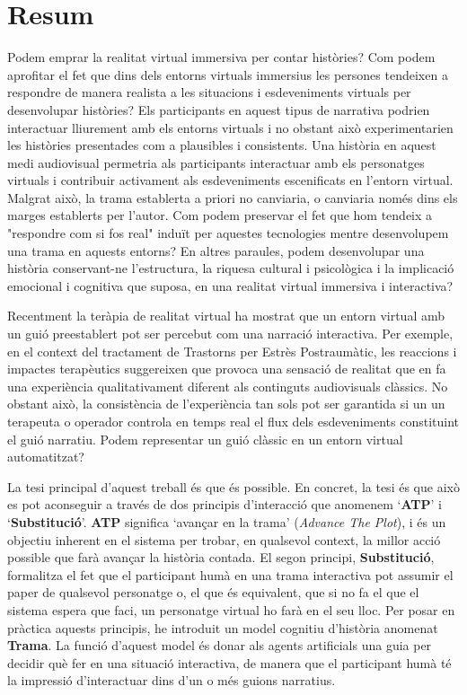 \documentclass[
		twoside,openright,titlepage,numbers=noenddot,manychapters,
		headinclude,%
                footinclude=false,cleardoublepage=empty,
                BCOR=5mm,
		fontsize=11pt, %
                 enabledeprecatedfontcommands]{scrreprt}
\begin{document}
\chapter*{Resum}
\thispagestyle{empty}
Podem emprar la realitat virtual immersiva per contar històries? Com podem aprofitar el fet que dins dels entorns virtuals immersius les persones tendeixen a respondre de manera realista a les situacions i esdeveniments virtuals per desenvolupar històries? Els participants en aquest tipus de narrativa podrien interactuar lliurement  amb els entorns virtuals i no obstant això experimentarien les històries presentades com a plausibles i consistents. Una història en aquest medi audiovisual permetria als participants interactuar amb els personatges virtuals i contribuir activament als esdeveniments escenificats en l'entorn virtual. Malgrat això, la trama establerta a priori no canviaria, o canviaria només dins els marges establerts per l'autor. Com podem preservar el fet que hom tendeix a "respondre com si fos real" induït per aquestes tecnologies mentre desenvolupem una trama en aquests entorns? En altres paraules, podem desenvolupar una història conservant-ne l'estructura, la riquesa cultural i psicològica i la implicació emocional i cognitiva que suposa, en una realitat virtual immersiva i interactiva?

Recentment la teràpia de realitat virtual ha mostrat que un entorn virtual  amb un guió preestablert pot ser percebut com una narració interactiva. Per exemple, en el context del tractament de Trastorns per Estrès Postraumàtic, les reaccions i impactes terapèutics suggereixen que provoca una sensació de realitat que en fa una experiència qualitativament diferent als continguts audiovisuals clàssics. No obstant això, la consistència de l'experiència tan sols pot ser garantida si un un terapeuta o operador controla en temps real el flux dels esdeveniments constituint el guió narratiu. Podem representar un guió clàssic en un entorn virtual automatitzat?

La tesi principal d'aquest treball és que és possible. En concret, la tesi és que això es pot aconseguir a través de dos principis d'interacció que anomenem `\textbf {ATP}' i `\textbf {Substitució}'. \textbf {ATP} significa `avançar en la trama' (\emph{Advance The Plot}), i és un objectiu inherent  en el sistema per trobar, en qualsevol context, la millor acció possible que farà avançar la història contada. El segon principi, \textbf {Substitució}, formalitza el fet que el participant humà en una trama interactiva pot assumir el paper de qualsevol personatge o, el que és equivalent, que si no fa el que el sistema espera que faci, un personatge virtual ho farà en el seu lloc. Per posar en pràctica aquests principis, he introduit un model cognitiu d'història anomenat \textbf {Trama}. La funció d'aquest model és donar als agents artificials una guia per decidir què fer en una situació interactiva, de manera que el participant humà té la impressió d'interactuar dins d'un o més guions narratius.
\end{document}
